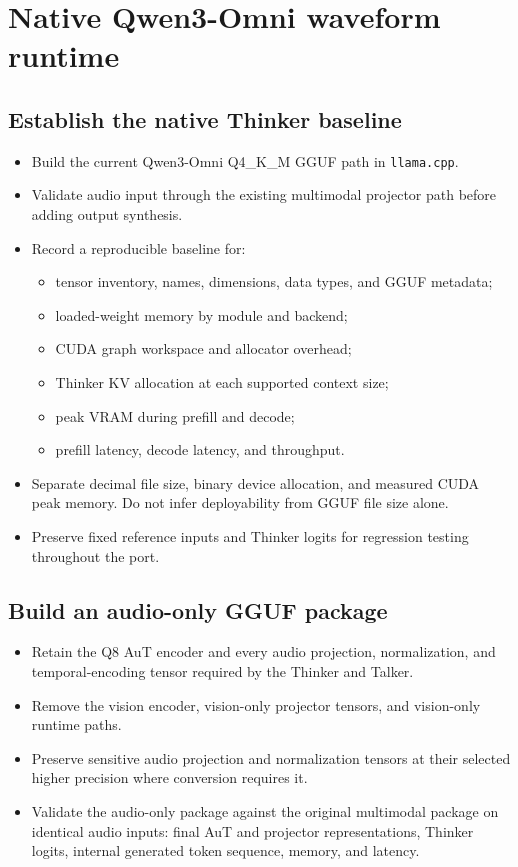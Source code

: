 \documentclass[10pt,letterpaper]{article}
\newcommand{\code}[1]{\texttt{#1}}
\begin{document}
\section{Native Qwen3-Omni waveform runtime}

\subsection{Establish the native Thinker baseline}
\begin{itemize}
    \item Build the current Qwen3-Omni Q4\_K\_M GGUF path in \code{llama.cpp}.
    \item Validate audio input through the existing multimodal projector path before adding output synthesis.
    \item Record a reproducible baseline for:
    \begin{itemize}
        \item tensor inventory, names, dimensions, data types, and GGUF metadata;
        \item loaded-weight memory by module and backend;
        \item CUDA graph workspace and allocator overhead;
        \item Thinker KV allocation at each supported context size;
        \item peak VRAM during prefill and decode;
        \item prefill latency, decode latency, and throughput.
    \end{itemize}
    \item Separate decimal file size, binary device allocation, and measured CUDA peak memory. Do not infer deployability from GGUF file size alone.
    \item Preserve fixed reference inputs and Thinker logits for regression testing throughout the port.
\end{itemize}

\subsection{Build an audio-only GGUF package}
\begin{itemize}
    \item Retain the Q8 AuT encoder and every audio projection, normalization, and temporal-encoding tensor required by the Thinker and Talker.
    \item Remove the vision encoder, vision-only projector tensors, and vision-only runtime paths.
    \item Preserve sensitive audio projection and normalization tensors at their selected higher precision where conversion requires it.
    \item Validate the audio-only package against the original multimodal package on identical audio inputs: final AuT and projector representations, Thinker logits, internal generated token sequence, memory, and latency.
\end{itemize}
\end{document}

